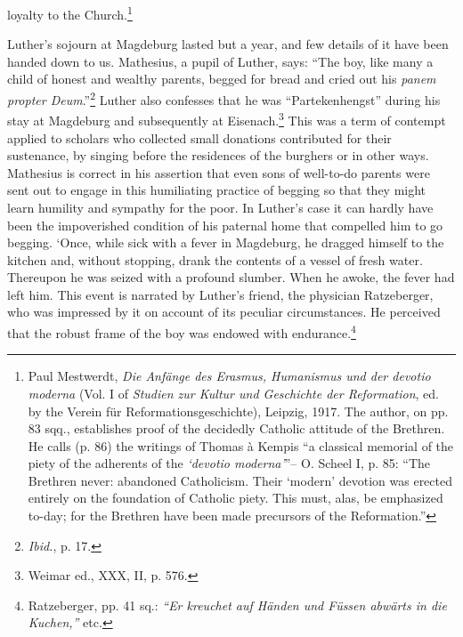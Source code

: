 loyalty to the Church.\footnote
{Paul Mestwerdt, \textit{Die Anfänge des Erasmus, Humanismus und der devotio moderna}
(Vol. I of \textit{Studien zur Kultur und Geschichte der Reformation}, ed. by the Verein für
Reformationsgeschichte), Leipzig, 1917. The author, on pp. 83 sqq., establishes proof of
the decidedly Catholic attitude of the Brethren. He calls (p. 86) the writings of Thomas
à Kempis “a classical memorial of the piety of the adherents of the \textit{‘devotio moderna’}”--
O. Scheel I, p. 85: “The Brethren never: abandoned Catholicism. Their ‘modern’ devotion
was erected entirely on the foundation of Catholic piety. This must, alas, be emphasized
to-day; for the Brethren have been made precursors of the Reformation.”
}

Luther’s sojourn at Magdeburg lasted but a year, and few details
of it have been handed down to us. Mathesius, a pupil of Luther,
says: “The boy, like many a child of honest and wealthy parents,
begged for bread and cried out his \textit{panem propter Deum}.”\footnote{\textit{Ibid.}, p. 17.}
Luther
also confesses that he was “Partekenhengst” during his stay at Magdeburg
and subsequently at Eisenach.\footnote{Weimar ed., XXX, II, p. 576.}
This was a term of contempt
applied to scholars who collected small donations contributed for their
sustenance, by singing before the residences of the burghers or in other
ways. Mathesius is correct in his assertion that even sons of well-to-do
parents were sent out to engage in this humiliating practice of begging
so that they might learn humility and sympathy for the poor. In
Luther’s case it can hardly have been the impoverished condition of
his paternal home that compelled him to go begging.
‘Once, while sick with a fever in Magdeburg, he dragged himself to
the kitchen and, without stopping, drank the contents of a vessel of
fresh water. Thereupon he was seized with a profound slumber. When
he awoke, the fever had left him. This event is narrated by Luther’s
friend, the physician Ratzeberger, who was impressed by it on account
of its peculiar circumstances. He perceived that the robust
frame of the boy was endowed with endurance.\footnote{Ratzeberger, pp. 41 sq.: \textit{“Er kreuchet auf Händen und Füssen abwärts in die Kuchen,”} etc.}

